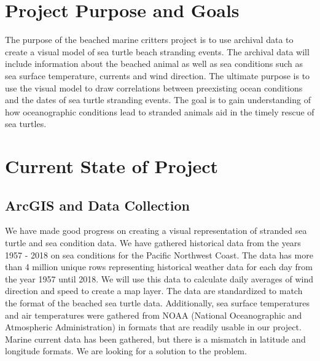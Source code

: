 \documentclass[onecolumn, draftclsnofoot,10pt, compsoc]{IEEEtran}
\begin{document}
\begin{titlepage}
\begin{singlespace}
\begin{abstract}
        \end{abstract}     
    \end{singlespace}
\end{titlepage}
\newpage
{}
\tableofcontents
\listoffigures
\clearpage

\section{Project Purpose and Goals}
The purpose of the beached marine critters project is to use archival data to create a visual model of sea turtle beach stranding events. The archival data will include information about the beached animal as well as sea conditions such as sea surface temperature, currents and wind direction. The ultimate purpose is to use the visual model to draw correlations between preexisting ocean conditions and the dates of sea turtle stranding events. The goal is to gain understanding of how oceanographic conditions lead to stranded animals aid in the timely rescue of sea turtles.

\section{Current State of Project}
\subsection{ArcGIS and Data Collection}
We have made good progress on creating a visual representation of stranded sea turtle and sea condition data.
We have gathered historical data from the years 1957 - 2018 on sea conditions for the Pacific Northwest Coast\cite{noaa}. The data has more than 4 million unique rows representing historical weather data for each day from the year 1957 until 2018. We will use this data to calculate daily averages of wind direction and speed to create a map layer. The data are standardized to match the format of the beached sea turtle data. Additionally, sea surface temperatures and air temperatures were gathered from NOAA\cite{sst}\cite{rest} (National Oceanographic and Atmospheric Administration) in formats that are readily usable in our project. Marine current data has been gathered\cite{jpl}, but there is a mismatch in latitude and longitude formats.  We are looking for a solution to the problem.
\end{document}
